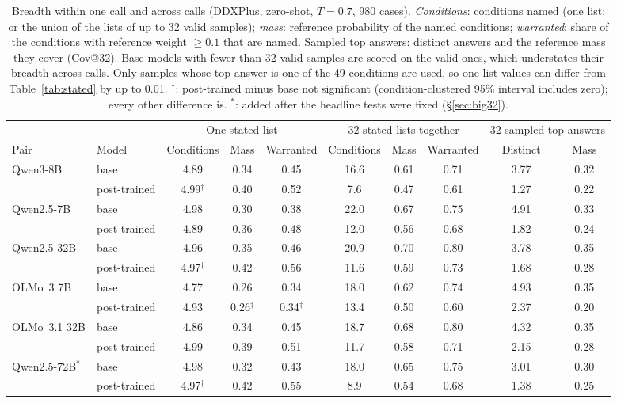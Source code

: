 \documentclass[11pt]{article}
\begin{document}
\begin{table}[t]
\centering\small
\setlength{\tabcolsep}{3.5pt}
\begin{adjustbox}{max width=\linewidth}
\begin{tabular}{llcccccccc}
\toprule
 & & \multicolumn{3}{c}{One stated list} & \multicolumn{3}{c}{32 stated lists together} & \multicolumn{2}{c}{32 sampled top answers} \\
Pair & Model & Conditions & Mass & Warranted & Conditions & Mass & Warranted & Distinct & Mass \\
\midrule
Qwen3-8B & base & 4.89 & 0.34 & 0.45 & 16.6 & 0.61 & 0.71 & 3.77 & 0.32 \\
 & post-trained & 4.99$^{\dagger}$ & 0.40 & 0.52 & 7.6 & 0.47 & 0.61 & 1.27 & 0.22 \\
Qwen2.5-7B & base & 4.98 & 0.30 & 0.38 & 22.0 & 0.67 & 0.75 & 4.91 & 0.33 \\
 & post-trained & 4.89 & 0.36 & 0.48 & 12.0 & 0.56 & 0.68 & 1.82 & 0.24 \\
Qwen2.5-32B & base & 4.96 & 0.35 & 0.46 & 20.9 & 0.70 & 0.80 & 3.78 & 0.35 \\
 & post-trained & 4.97$^{\dagger}$ & 0.42 & 0.56 & 11.6 & 0.59 & 0.73 & 1.68 & 0.28 \\
OLMo~3 7B & base & 4.77 & 0.26 & 0.34 & 18.0 & 0.62 & 0.74 & 4.93 & 0.35 \\
 & post-trained & 4.93 & 0.26$^{\dagger}$ & 0.34$^{\dagger}$ & 13.4 & 0.50 & 0.60 & 2.37 & 0.20 \\
OLMo~3.1 32B & base & 4.86 & 0.34 & 0.45 & 18.7 & 0.68 & 0.80 & 4.32 & 0.35 \\
 & post-trained & 4.99 & 0.39 & 0.51 & 11.7 & 0.58 & 0.71 & 2.15 & 0.28 \\
Qwen2.5-72B$^{*}$ & base & 4.98 & 0.32 & 0.43 & 18.0 & 0.65 & 0.75 & 3.01 & 0.30 \\
 & post-trained & 4.97$^{\dagger}$ & 0.42 & 0.55 & 8.9 & 0.54 & 0.68 & 1.38 & 0.25 \\
\bottomrule
\end{tabular}
\end{adjustbox}
\caption{Breadth within one call and across calls (DDXPlus, zero-shot, $T{=}0.7$, 980 cases). \emph{Conditions}: conditions named (one list; or the union of the lists of up to 32 valid samples); \emph{mass}: reference probability of the named conditions; \emph{warranted}: share of the conditions with reference weight $\geq 0.1$ that are named. Sampled top answers: distinct answers and the reference mass they cover (Cov@32). Base models with fewer than 32 valid samples are scored on the valid ones, which understates their breadth across calls. Only samples whose top answer is one of the 49 conditions are used, so one-list values can differ from Table~\ref{tab:stated} by up to 0.01. $^{\dagger}$: post-trained minus base not significant (condition-clustered 95\% interval includes zero); every other difference is. $^{*}$: added after the headline tests were fixed (\S\ref{sec:big32}).}
\label{tab:breadth}
\end{table}
\end{document}
